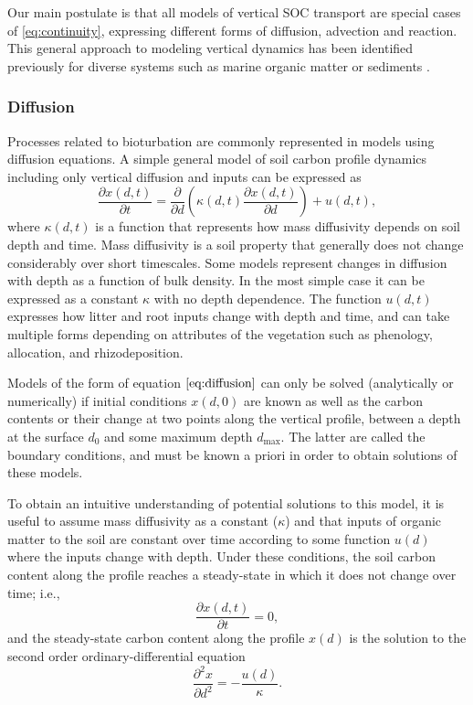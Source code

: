 \documentclass[11pt, oneside, a4paper]{article}   	%
\begin{document}
Our main postulate is that all models of vertical SOC transport are special cases of \ref{eq:continuity}, expressing different forms of diffusion, advection and reaction. This general approach to modeling vertical dynamics has been identified previously for diverse systems such as marine organic matter \citep{Sarmiento2006} or sediments \citep{Arndt2013}.

\subsubsection{Diffusion}
Processes related to bioturbation are commonly represented in models using diffusion equations. 
A simple general model of soil carbon profile dynamics including only vertical diffusion and inputs can be expressed as
\begin{equation} \label{eq:diffusion}
\frac{\partial x(d,t)}{\partial t} = \frac{\partial}{\partial d} \left( \kappa(d, t) \frac{\partial x(d, t)}{\partial d} \right) + u (d, t),
\end{equation}
where $\kappa(d, t)$ is a function that represents how mass diffusivity depends on soil depth and time. Mass diffusivity is a soil property that generally does not change considerably over short timescales. Some models represent changes in diffusion with depth as a function of bulk density. In the most simple case it can be expressed as a constant $\kappa$ with no depth dependence. The function $u(d, t)$ expresses how litter and root inputs change with depth and time, and can take multiple forms depending on attributes of the vegetation such as phenology, allocation, and rhizodeposition. 

Models of the form of equation $\ref{eq:diffusion}$ can only be solved (analytically or numerically) if initial conditions $x(d, 0)$ are known as well as the carbon contents or their change at two points along the vertical profile, between a depth at the surface $d_0$ and some maximum depth $d_{\max}$. The latter  are called the boundary conditions, and must be known a priori in order to obtain solutions of these models. 

To obtain an intuitive understanding of potential solutions to this model, it is useful to assume mass diffusivity as a constant ($\kappa$) and that inputs of organic matter to the soil are constant over time according to some function $u(d)$ where the inputs change with depth. Under these conditions, the soil carbon content along the profile reaches a steady-state in which it does not change over time; i.e.,
$$
\frac{\partial x(d, t)}{\partial t} = 0, 
$$
and the steady-state carbon content along the profile $x(d)$ is the solution to the second order ordinary-differential equation
\begin{equation} \label{eq:xpp}
\frac{\partial^2 x}{\partial d^2} = - \frac{u(d)}{\kappa}.
\end{equation}
\end{document}

